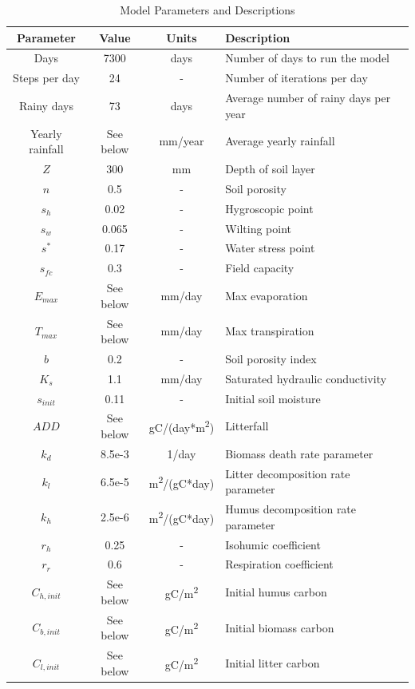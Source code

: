 \documentclass[12pt, letterpaper]{article}
\begin{document}
\begin{table}[p]
\begin{center}
\begin{tabular}{ c c c l }
Parameter & Value & Units & Description \\
\hline 
Days & 7300 & days & Number of days to run the model \\
Steps per day & 24 & - & Number of iterations per day \\
Rainy days &  73 & days & Average number of rainy days per year \\
Yearly rainfall & See below & mm/year & Average yearly rainfall \\
$Z$ & 300 & mm & Depth of soil layer \\
$n$ & 0.5 & - & Soil porosity \\
$s_h$ & 0.02 & - & Hygroscopic point \\
$s_w$ & 0.065 & - & Wilting point \\
$s^*$ & 0.17 & - & Water stress point \\
$s_{fc}$ & 0.3 & - & Field capacity \\
$E_{max}$ & See below & mm/day & Max evaporation \\
$T_{max}$ & See below & mm/day & Max transpiration \\
$b$ & 0.2 & - & Soil porosity index \\
$K_s$ & 1.1 & mm/day & Saturated hydraulic conductivity \\
$s_{init}$ & 0.11 & - & Initial soil moisture \\
$ ADD $ & See below & gC/(day*m\textsuperscript{2}) & Litterfall \\
$k_d$ & 8.5e-3 & 1/day & Biomass death rate parameter \\
$k_l$ & 6.5e-5 & m\textsuperscript{2}/(gC*day) & Litter decomposition rate parameter \\
$k_h$ & 2.5e-6 & m\textsuperscript{2}/(gC*day) & Humus decomposition rate parameter \\
$r_h$ & 0.25 & - & Isohumic coefficient \\
$r_r$ & 0.6 & - & Respiration coefficient \\
$C_{h,init}$ & See below & gC/m\textsuperscript{2} & Initial humus carbon \\
$C_{b,init}$ & See below & gC/m\textsuperscript{2} & Initial biomass carbon \\
$C_{l,init}$ & See below & gC/m\textsuperscript{2} & Initial litter carbon 

\end{tabular}
\end{center}
\caption{\label{tab:table-name}Model Parameters and Descriptions}
\end{table}
\end{document}
